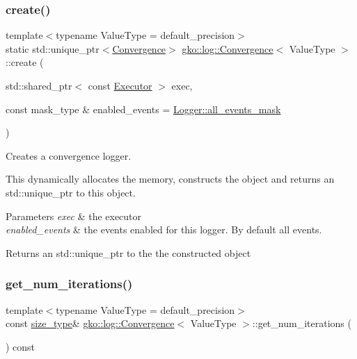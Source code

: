 \subsubsection{\texorpdfstring{create()}{create()}}
{\footnotesize\ttfamily template$<$typename Value\+Type  = default\+\_\+precision$>$ \\
static std\+::unique\+\_\+ptr$<$\hyperlink{classgko_1_1log_1_1Convergence}{Convergence}$>$ \hyperlink{classgko_1_1log_1_1Convergence}{gko\+::log\+::\+Convergence}$<$ Value\+Type $>$\+::create (\begin{DoxyParamCaption}\item[{std\+::shared\+\_\+ptr$<$ const \hyperlink{classgko_1_1Executor}{Executor} $>$}]{exec,  }\item[{const mask\+\_\+type \&}]{enabled\+\_\+events = {\ttfamily \hyperlink{classgko_1_1log_1_1Logger_a02534863a2d2f92dfeb2c39038365532}{Logger\+::all\+\_\+events\+\_\+mask}} }\end{DoxyParamCaption})\hspace{0.3cm}{\ttfamily [static]}}



Creates a convergence logger. 

This dynamically allocates the memory, constructs the object and returns an std\+::unique\+\_\+ptr to this object.


\begin{DoxyParams}{Parameters}
{\em exec} & the executor \\
\hline
{\em enabled\+\_\+events} & the events enabled for this logger. By default all events.\\
\hline
\end{DoxyParams}
\begin{DoxyReturn}{Returns}
an std\+::unique\+\_\+ptr to the the constructed object 
\end{DoxyReturn}
\mbox{\label{classgko_1_1log_1_1Convergence_ae4f2ae84d87df2bffa814f51a8f09793}} 
\subsubsection{\texorpdfstring{get\+\_\+num\+\_\+iterations()}{get\_num\_iterations()}}
{\footnotesize\ttfamily template$<$typename Value\+Type  = default\+\_\+precision$>$ \\
const \hyperlink{namespacegko_a6e5c95df0ae4e47aab2f604a22d98ee7}{size\+\_\+type}\& \hyperlink{classgko_1_1log_1_1Convergence}{gko\+::log\+::\+Convergence}$<$ Value\+Type $>$\+::get\+\_\+num\+\_\+iterations (\begin{DoxyParamCaption}{ }\end{DoxyParamCaption}) const\hspace{0.3cm}{\ttfamily [noexcept]}}



